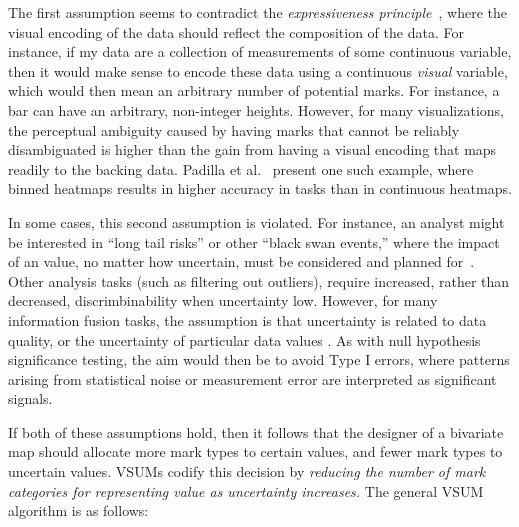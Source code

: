 \documentclass{vgtc}                          %
\begin{document}
The first assumption seems to contradict the \emph{expressiveness principle}~\cite{mackinlay1986automating}, where the visual encoding of the data should reflect the composition of the data. For instance, if my data are a collection of measurements of some continuous variable, then it would make sense to encode these data using a continuous \emph{visual} variable, which would then mean an arbitrary number of potential marks. For instance, a bar can have an arbitrary, non-integer heights. However, for many visualizations, the perceptual ambiguity caused by having marks that cannot be reliably disambiguated is higher than the gain from having a visual encoding that maps readily to the backing data. Padilla et al.~\cite{padilla2017evaluating} present one such example, where binned heatmaps results in higher accuracy in tasks than in continuous heatmaps.

In some cases, this second assumption is violated. For instance, an analyst might be interested in ``long tail risks'' or other ``black swan events,'' where the impact of an value, no matter how uncertain, must be considered and planned for~\cite{taleb2011black}. Other analysis tasks (such as filtering out outliers), require increased, rather than decreased, discrimbinability when uncertainty low. However, for many information fusion tasks, the assumption is that uncertainty is related to data quality, or the uncertainty of particular data values \cite{riveiro2007evaluation}. As with null hypothesis significance testing, the aim would then be to avoid Type I errors, where patterns arising from statistical noise or measurement error are interpreted as significant signals.

If both of these assumptions hold, then it follows that the designer of a bivariate map should allocate more mark types to certain values, and fewer mark types to uncertain values. VSUMs codify this decision by \emph{reducing the number of mark categories for representing value as uncertainty increases.} The general VSUM algorithm is as follows:
\end{document}
